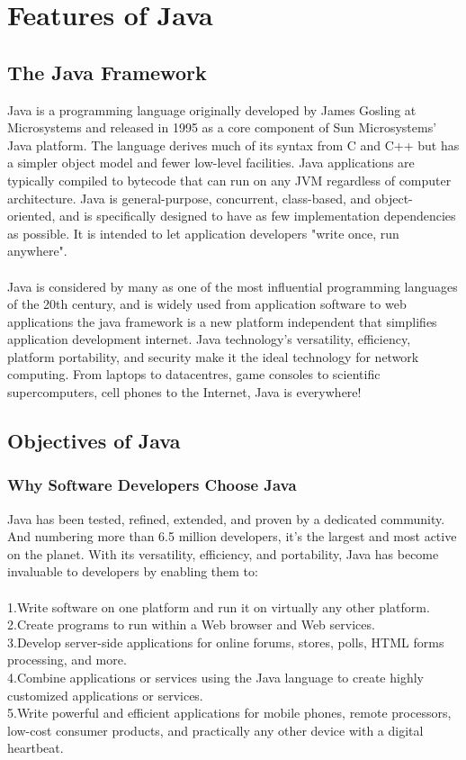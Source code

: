 \documentclass[BTech]{srmuthesis}
\begin{document}
\section{Features of Java}
\subsection{The Java Framework}
Java is a programming language originally developed by James Gosling at Microsystems and released in 1995 as a core component of Sun Microsystems' Java platform. The language derives much of its syntax from C and C++ but has a simpler object model and fewer low-level facilities. Java applications are typically compiled to bytecode that can run on any \ac{JVM} regardless of computer architecture. Java is general-purpose, concurrent, class-based, and object-oriented, and is specifically designed to have as few implementation dependencies as possible. It is intended to let application developers "write once, run anywhere".\\\\
Java is considered by many as one of the most influential programming languages of the 20th century, and is widely used from application software to web applications the java framework is a new platform independent that simplifies application development internet. Java technology's versatility, efficiency, platform portability, and security make it the ideal technology for network computing. From laptops to datacentres, game consoles to scientific supercomputers, cell phones to the Internet, Java is everywhere!\\
\subsection{Objectives of Java}
\subsubsection{Why Software Developers Choose Java}
Java has been tested, refined, extended, and proven by a dedicated community. And numbering more than 6.5 million developers, it's the largest and most active on the planet. With its versatility, efficiency, and portability, Java has become invaluable to developers by enabling them to:\\\\
1.Write software on one platform and run it on virtually any other platform.\\
2.Create programs to run within a Web browser and Web services.\\
3.Develop server-side applications for online forums, stores, polls, HTML forms processing, and more.\\
4.Combine applications or services using the Java language to create highly customized applications or services.\\
5.Write powerful and efficient applications for mobile phones, remote processors, low-cost consumer products, and practically any other device with a digital heartbeat.\\
\end{document}
